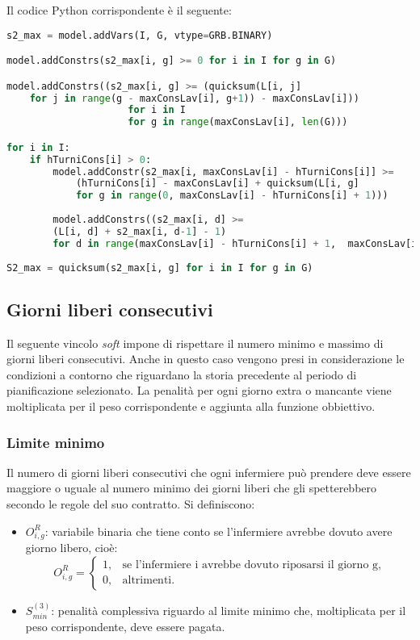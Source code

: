 Il codice Python corrispondente è il seguente:
\begin{lstlisting}[language=Python]
s2_max = model.addVars(I, G, vtype=GRB.BINARY)

model.addConstrs(s2_max[i, g] >= 0 for i in I for g in G)

model.addConstrs((s2_max[i, g] >= (quicksum(L[i, j] 
	for j in range(g - maxConsLav[i], g+1)) - maxConsLav[i]))
                     for i in I
                     for g in range(maxConsLav[i], len(G)))

for i in I:
	if hTurniCons[i] > 0:
		model.addConstr(s2_max[i, maxConsLav[i] - hTurniCons[i]] >= 
			(hTurniCons[i] - maxConsLav[i] + quicksum(L[i, g] 
			for g in range(0, maxConsLav[i] - hTurniCons[i] + 1)))
			
		model.addConstrs((s2_max[i, d] >= 
		(L[i, d] + s2_max[i, d-1] - 1) 
		for d in range(maxConsLav[i] - hTurniCons[i] + 1,  maxConsLav[i])))
                      
S2_max = quicksum(s2_max[i, g] for i in I for g in G)
\end{lstlisting}


\subsection{Giorni liberi consecutivi}
Il seguente vincolo \textit{soft} impone di rispettare il numero minimo e massimo di giorni liberi consecutivi. Anche in questo caso vengono presi in considerazione le condizioni a contorno che riguardano la storia precedente al periodo di pianificazione selezionato. La penalità per ogni giorno extra o mancante viene moltiplicata per il peso corrispondente e aggiunta alla funzione obbiettivo.

\subsubsection{Limite minimo}
Il numero di giorni liberi consecutivi che ogni infermiere può prendere deve essere maggiore o uguale al numero minimo dei giorni liberi che gli spetterebbero secondo le regole del suo contratto. Si definiscono:
\begin{itemize}
\item $O_{i,g}^R$: variabile binaria che tiene conto se l'infermiere avrebbe dovuto avere giorno libero, cioè:
\begin{equation}
\label{eq:varStarbbeACasa}
O_{i,g}^R=
\begin{cases}
1, & \text{se l'infermiere i avrebbe dovuto riposarsi il giorno g,} \\
0, & \text{altrimenti.}
\end{cases}
\end{equation}
\item $S^{(3)}_{min}$: penalità complessiva riguardo al limite minimo che, moltiplicata per il peso corrispondente, deve essere pagata.
\end{itemize}

